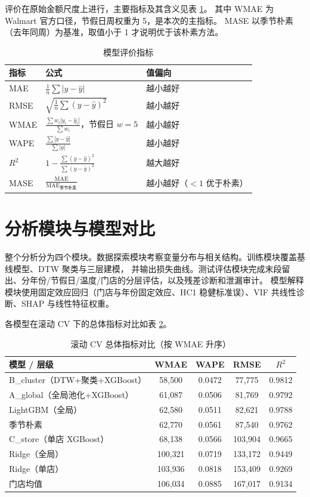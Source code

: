 \documentclass[UTF8,a4paper,11pt]{ctexart}
\begin{document}
评价在原始金额尺度上进行，主要指标及其含义见表 \ref{tab:metrics}。
其中 WMAE 为 Walmart 官方口径，节假日周权重为 5，是本次的主指标。
MASE 以季节朴素（去年同周）为基准，取值小于 1 才说明优于该朴素方法。

\begin{table}[H]
\centering
\caption{模型评价指标}
\label{tab:metrics}
\small
\begin{tabular}{lll}
\toprule
指标 & 公式 & 值偏向 \\
\midrule
MAE & $\frac{1}{n}\sum|y-\hat{y}|$ & 越小越好 \\
RMSE & $\sqrt{\frac{1}{n}\sum(y-\hat{y})^2}$ & 越小越好 \\
WMAE & $\frac{\sum w_i|y_i-\hat{y}_i|}{\sum w_i}$，节假日 $w=5$ & 越小越好 \\
WAPE & $\frac{\sum|y-\hat{y}|}{\sum|y|}$ & 越小越好 \\
$R^2$ & $1-\frac{\sum(y-\hat{y})^2}{\sum(y-\bar{y})^2}$ & 越大越好 \\
MASE & $\frac{\mathrm{MAE}}{\mathrm{MAE}_{\text{季节朴素}}}$ & 越小越好（$<1$ 优于朴素） \\
\bottomrule
\end{tabular}
\end{table}

\section{分析模块与模型对比}

整个分析分为四个模块。数据探索模块考察变量分布与相关结构。训练模块覆盖基线模型、DTW 聚类与三层建模，
并输出损失曲线。测试评估模块完成末段留出、分年份/节假日/温度/门店的分层评估，以及残差诊断和泄漏审计。
模型解释模块使用固定效应回归（门店与年份固定效应、HC1 稳健标准误）、VIF 共线性诊断、SHAP 与线性特征权重。

各模型在滚动 CV 下的总体指标对比如表 \ref{tab:compare}。

\begin{table}[H]
\centering
\caption{滚动 CV 总体指标对比（按 WMAE 升序）}
\label{tab:compare}
\small
\begin{tabular}{lcccc}
\toprule
模型 / 层级 & WMAE & WAPE & RMSE & $R^2$ \\
\midrule
B\_cluster（DTW+聚类+XGBoost） & 58{,}500 & 0.0472 & 77{,}775 & 0.9812 \\
A\_global（全局池化+XGBoost） & 61{,}087 & 0.0506 & 81{,}769 & 0.9792 \\
LightGBM（全局） & 62{,}580 & 0.0511 & 82{,}621 & 0.9788 \\
季节朴素 & 62{,}770 & 0.0561 & 87{,}540 & 0.9762 \\
C\_store（单店 XGBoost） & 68{,}138 & 0.0566 & 103{,}904 & 0.9665 \\
Ridge（全局） & 100{,}321 & 0.0719 & 133{,}172 & 0.9449 \\
Ridge（单店） & 103{,}936 & 0.0818 & 153{,}409 & 0.9269 \\
门店均值 & 106{,}034 & 0.0885 & 167{,}017 & 0.9134 \\
\bottomrule
\end{tabular}
\end{table}
\end{document}
